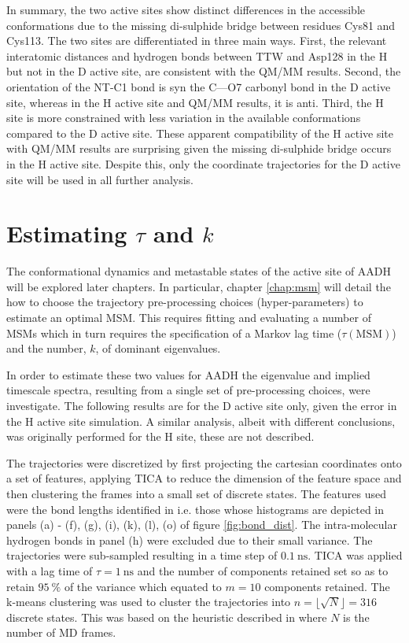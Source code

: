 In summary, the two active sites show distinct differences in the accessible conformations due to the missing di-sulphide bridge between residues Cys81 and Cys113. The two sites are differentiated in three main ways. First, the relevant interatomic distances and hydrogen bonds between TTW and Asp128 in the H but not in the D active site, are consistent with the QM/MM results. Second, the orientation of the NT-C1 bond is syn the C---O7 carbonyl bond in the D active site, whereas in the H active site and QM/MM results, it is anti. Third, the H site is more constrained with less variation in the available conformations compared to the  D active site. These apparent compatibility of the H active site with QM/MM results are surprising given the missing di-sulphide bridge occurs in the H active site. Despite this, only the  coordinate trajectories for the D active site will be used in all further analysis.  

\section{Estimating $\tau$ and $k$}\label{sec:aadh_msm}

The conformational dynamics and metastable states of the active site of AADH will be explored later chapters. In particular, chapter \ref{chap:msm} will detail the how to choose the trajectory pre-processing choices (hyper-parameters) to estimate an optimal MSM. This requires fitting and evaluating a number of MSMs which in turn requires the specification of a Markov lag time ($\tau(\mathrm{MSM})$) and the number, $k$, of dominant eigenvalues. 

In order to estimate these two values for AADH the eigenvalue and implied timescale spectra, resulting from a single set of pre-processing choices, were investigate. The following results are for the D active site only, given the error in the H active site simulation. A similar analysis, albeit with different conclusions, was originally performed for the H site, these are not described. 

The trajectories were discretized by first projecting the cartesian coordinates onto a set of features, applying TICA to reduce the dimension of the feature space and then clustering the frames into a small set of discrete states.  The features used were the bond lengths identified in \cite{ranaghanInitioQMMM2017} i.e. those whose histograms are depicted in panels (a) - (f), (g), (i), (k), (l), (o) of figure \ref{fig:bond_dist}. The intra-molecular hydrogen bonds in panel (h) were excluded due to their small variance. The trajectories were sub-sampled resulting in a time step of $\SI{0.1}{\nano\second}$. TICA was applied with a lag time of $\tau=\SI{1}{\nano\second}$ and the number of components retained set so as to retain $\SI{95}{\percent}$ of the variance which equated to $m=10$ components retained. The k-means clustering was used to cluster the trajectories into $n=\lfloor\sqrt{N}\rfloor = 316$ discrete states. This was based on the heuristic described in \cite{husicWardClusteringImproves2017a} where $N$ is the number of MD frames.  

